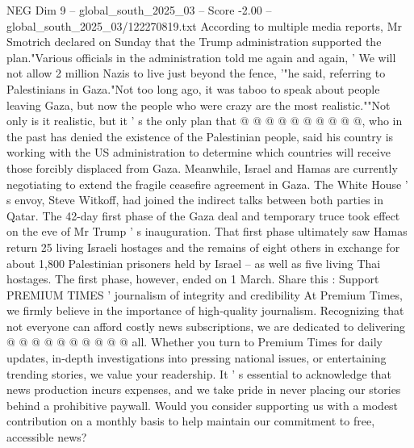 \begin{textsample}{NEG Dim 9 – global\_south\_2025\_03 – Score -2.00 – global\_south\_2025\_03/122270819.txt}
According to multiple media reports, Mr Smotrich declared on Sunday that the Trump administration supported the plan."Various officials in the administration told me again and again, ' We will not allow 2 million Nazis to live just beyond the fence, '"he said, referring to Palestinians in Gaza."Not too long ago, it was taboo to speak about people leaving Gaza, but now the people who were crazy are the most realistic.""Not only is it realistic, but it ' s the only plan that @ @ @ @ @ @ @ @ @ @, who in the past has denied the existence of the Palestinian people, said his country is working with the US administration to determine which countries will receive those forcibly displaced from Gaza.
Meanwhile, Israel and Hamas are currently negotiating to extend the fragile ceasefire agreement in Gaza.
The White House ' s envoy, Steve Witkoff, had joined the indirect talks between both parties in Qatar.
The 42-day first phase of the Gaza deal and temporary truce took effect on the eve of Mr Trump ' s inauguration.
That first phase ultimately saw Hamas return 25 living Israeli hostages and the remains of eight others in exchange for about 1,800 Palestinian prisoners held by Israel -- as well as five living Thai hostages.
The first phase, however, ended on 1 March.
Share this : Support PREMIUM TIMES ' journalism of integrity and credibility At Premium Times, we firmly believe in the importance of high-quality journalism.
Recognizing that not everyone can afford costly news subscriptions, we are dedicated to delivering @ @ @ @ @ @ @ @ @ @ all.
Whether you turn to Premium Times for daily updates, in-depth investigations into pressing national issues, or entertaining trending stories, we value your readership.
It ' s essential to acknowledge that news production incurs expenses, and we take pride in never placing our stories behind a prohibitive paywall.
Would you consider supporting us with a modest contribution on a monthly basis to help maintain our commitment to free, accessible news?

\end{textsample}

